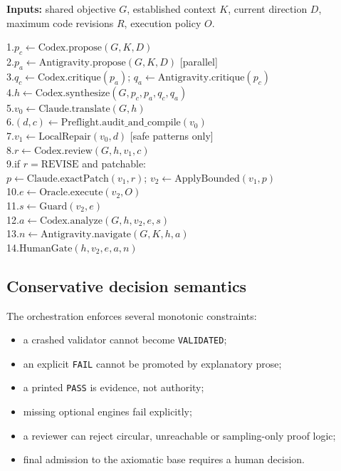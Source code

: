 \documentclass[10pt,a4paper]{article}
\begin{document}
\begin{plainbox}
\textbf{Inputs:} shared objective $G$, established context $K$, current direction $D$,
maximum code revisions $R$, execution policy $O$.

\medskip
\ttfamily\small
1.\quad $p_c \leftarrow \mathrm{Codex.propose}(G,K,D)$\\
2.\quad $p_a \leftarrow \mathrm{Antigravity.propose}(G,K,D)$ \hfill [parallel]\\
3.\quad $q_c \leftarrow \mathrm{Codex.critique}(p_a)$;\quad
             $q_a \leftarrow \mathrm{Antigravity.critique}(p_c)$\\
4.\quad $h \leftarrow \mathrm{Codex.synthesize}(G,p_c,p_a,q_c,q_a)$\\
5.\quad $v_0 \leftarrow \mathrm{Claude.translate}(G,h)$\\
6.\quad $(d,c) \leftarrow \mathrm{Preflight.audit\_and\_compile}(v_0)$\\
7.\quad $v_1 \leftarrow \mathrm{LocalRepair}(v_0,d)$ \hfill [safe patterns only]\\
8.\quad $r \leftarrow \mathrm{Codex.review}(G,h,v_1,c)$\\
9.\quad if $r=\mathrm{REVISE}$ and patchable:\\
\hspace*{7mm}$p \leftarrow \mathrm{Claude.exactPatch}(v_1,r)$;\quad
              $v_2 \leftarrow \mathrm{ApplyBounded}(v_1,p)$\\
10.\quad $e \leftarrow \mathrm{Oracle.execute}(v_2,O)$\\
11.\quad $s \leftarrow \mathrm{Guard}(v_2,e)$\\
12.\quad $a \leftarrow \mathrm{Codex.analyze}(G,h,v_2,e,s)$\\
13.\quad $n \leftarrow \mathrm{Antigravity.navigate}(G,K,h,a)$\\
14.\quad $\mathrm{HumanGate}(h,v_2,e,a,n)$
\end{plainbox}

\subsection*{Conservative decision semantics}

The orchestration enforces several monotonic constraints:

\begin{itemize}
  \item a crashed validator cannot become \texttt{VALIDATED};
  \item an explicit \texttt{FAIL} cannot be promoted by explanatory prose;
  \item a printed \texttt{PASS} is evidence, not authority;
  \item missing optional engines fail explicitly;
  \item a reviewer can reject circular, unreachable or sampling-only proof logic;
  \item final admission to the axiomatic base requires a human decision.
\end{itemize}
\end{document}
